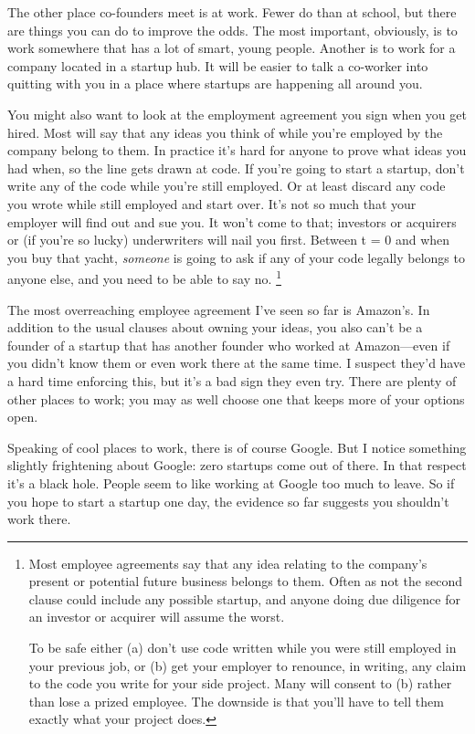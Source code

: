 The other place co-founders meet is at work. Fewer do than at school,
but there are things you can do to improve the odds. The most important,
obviously, is to work somewhere that has a lot of smart, young people.
Another is to work for a company located in a startup hub. It will be
easier to talk a co-worker into quitting with you in a place where
startups are happening all around you.

You might also want to look at the employment agreement you sign when
you get hired. Most will say that any ideas you think of while you're
employed by the company belong to them. In practice it's hard for anyone
to prove what ideas you had when, so the line gets drawn at code. If
you're going to start a startup, don't write any of the code while
you're still employed. Or at least discard any code you wrote while
still employed and start over. It's not so much that your employer will
find out and sue you. It won't come to that; investors or acquirers or
(if you're so lucky) underwriters will nail you first. Between t = 0 and
when you buy that yacht, \emph{someone} is going to ask if any of your
code legally belongs to anyone else, and you need to be able to say no.
\footnote{Most employee agreements say that any idea relating to the
company's present or potential future business belongs to them. Often as
not the second clause could include any possible startup, and anyone
doing due diligence for an investor or acquirer will assume the worst.

To be safe either (a) don't use code written while you were still
employed in your previous job, or (b) get your employer to renounce, in
writing, any claim to the code you write for your side project. Many
will consent to (b) rather than lose a prized employee. The downside is
that you'll have to tell them exactly what your project does.}

The most overreaching employee agreement I've seen so far is Amazon's.
In addition to the usual clauses about owning your ideas, you also can't
be a founder of a startup that has another founder who worked at
Amazon---even if you didn't know them or even work there at the same
time. I suspect they'd have a hard time enforcing this, but it's a bad
sign they even try. There are plenty of other places to work; you may as
well choose one that keeps more of your options open.

Speaking of cool places to work, there is of course Google. But I notice
something slightly frightening about Google: zero startups come out of
there. In that respect it's a black hole. People seem to like working at
Google too much to leave. So if you hope to start a startup one day, the
evidence so far suggests you shouldn't work there.

